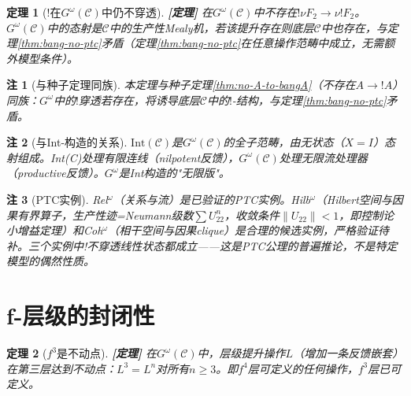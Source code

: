 \documentclass[11pt,a4paper]{article}
\newtheorem{theorem}{定理}
\newtheorem{remark}{注}
\newcommand{\lvl}[1]{\hfill\textbf{\footnotesize[#1]}}
\newcommand{\lvP}{\lvl{定理}}
\newcommand{\bang}{{!}}
\begin{document}
\begin{theorem}[!在$G^\omega(\mathcal{C})$中仍不穿透]\label{thm:bang-gomega}\lvP
在$G^\omega(\mathcal{C})$中不存在$\bang\nu F_2\to\nu\bang F_2$。$G^\omega(\mathcal{C})$中的态射是$\mathcal{C}$中的生产性Mealy机，若该提升存在则底层$\mathcal{C}$中也存在，与定理\ref{thm:bang-no-ptc}矛盾（定理\ref{thm:bang-no-ptc}在任意操作范畴中成立，无需额外模型条件）。
\end{theorem}

\begin{remark}[与种子定理同族]
本定理与种子定理\ref{thm:no-A-to-bangA}（不存在$A\to\bang A$）同族：$G^\omega$中的$\bang$穿透若存在，将诱导底层$\mathcal{C}$中的$\bang$-结构，与定理\ref{thm:bang-no-ptc}矛盾。
\end{remark}

\begin{remark}[与Int-构造的关系]
$\mathrm{Int}(\mathcal{C})$是$G^\omega(\mathcal{C})$的全子范畴，由无状态（$X=I$）态射组成。Int(C)处理有限连线（nilpotent反馈），$G^\omega(\mathcal{C})$处理无限流处理器（productive反馈）。$G^\omega$是Int构造的"无限版"。
\end{remark}

\begin{remark}[PTC实例]
Rel$^\omega$（关系与流）是已验证的PTC实例。Hilb$^\omega$（Hilbert空间与因果有界算子，生产性迹=Neumann级数$\sum U_{22}^n$，收敛条件$\|U_{22}\|<1$，即控制论小增益定理）和Coh$^\omega$（相干空间与因果clique）是合理的候选实例，严格验证待补。三个实例中!不穿透线性状态都成立——这是PTC公理的普遍推论，不是特定模型的偶然性质。
\end{remark}

\section{f-层级的封闭性}

\begin{theorem}[$f^3$是不动点]\label{thm:f3-fixedpoint}\lvP
在$G^\omega(\mathcal{C})$中，层级提升操作$L$（增加一条反馈嵌套）在第三层达到不动点：$L^3=L^n$对所有$n\geq3$。即$f^4$层可定义的任何操作，$f^3$层已可定义。
\end{theorem}
\end{document}

